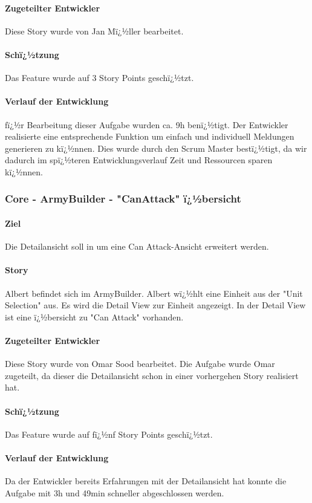 \documentclass[12pt, titlepage]{scrartcl}
\begin{document}
			\paragraph{Zugeteilter Entwickler} Diese Story wurde von Jan Mï¿½ller bearbeitet. 
			\paragraph{Schï¿½tzung}
			Das Feature wurde auf 3 Story Points geschï¿½tzt.
			\paragraph{Verlauf der Entwicklung} 
			fï¿½r Bearbeitung dieser Aufgabe wurden ca. 9h benï¿½tigt. Der Entwickler realisierte eine entsprechende Funktion um einfach und individuell Meldungen generieren zu kï¿½nnen. Dies wurde durch den Scrum Master bestï¿½tigt, da wir dadurch im spï¿½teren Entwicklungsverlauf Zeit und Ressourcen sparen kï¿½nnen.
			
			\subsubsection{Core - ArmyBuilder - "CanAttack" ï¿½bersicht}
			\paragraph{Ziel} Die Detailansicht soll in um eine \glqq Can Attack\grqq-Ansicht erweitert werden.
			\paragraph{Story} Albert befindet sich im ArmyBuilder. Albert wï¿½hlt eine Einheit aus der "Unit Selection" aus. Es wird die Detail View zur Einheit angezeigt. In der Detail View ist eine ï¿½bersicht zu "Can Attack" vorhanden.
			\paragraph{Zugeteilter Entwickler} Diese Story wurde von Omar Sood bearbeitet. Die Aufgabe wurde Omar zugeteilt, da dieser die Detailansicht schon in einer vorhergehen Story realisiert hat.
			\paragraph{Schï¿½tzung}
			Das Feature wurde auf fï¿½nf Story Points geschï¿½tzt.
			\paragraph{Verlauf der Entwicklung} 
			Da der Entwickler bereits Erfahrungen mit der Detailansicht hat konnte die Aufgabe mit 3h und 49min schneller abgeschlossen werden.
			
\end{document}
